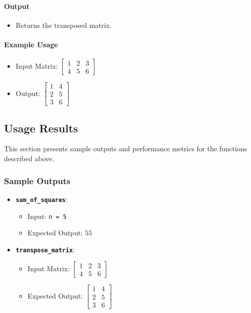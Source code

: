 \documentclass[11pt, a4paper]{article}
\newcommand{\function}[1]{\texttt{\color{blue}\textbf{#1}}}
\begin{document}
	\paragraph*{Output}
	\begin{itemize}
		\item Returns the transposed matrix.
	\end{itemize}
	
	\paragraph*{Example Usage}
	\begin{itemize}
		\item Input Matrix: $\begin{bmatrix} 1 & 2 & 3 \\ 4 & 5 & 6 \end{bmatrix}$
		\item Output: $\begin{bmatrix} 1 & 4 \\ 2 & 5 \\ 3 & 6 \end{bmatrix}$
	\end{itemize}
	
	\subsection*{Usage Results}
	This section presents sample outputs and performance metrics for the functions described above.
	
	\subsubsection*{Sample Outputs}
	\begin{itemize}
		\item \textbf{\function{sum\_of\_squares}}:
		\begin{itemize}
			\item Input: \texttt{n = 5}
			\item Expected Output: $55$
		\end{itemize}
		\item \textbf{\function{transpose\_matrix}}:
		\begin{itemize}
			\item Input Matrix: $\begin{bmatrix} 1 & 2 & 3 \\ 4 & 5 & 6 \end{bmatrix}$
			\item Expected Output: $\begin{bmatrix} 1 & 4 \\ 2 & 5 \\ 3 & 6 \end{bmatrix}$
		\end{itemize}
	\end{itemize}
	
\end{document}
